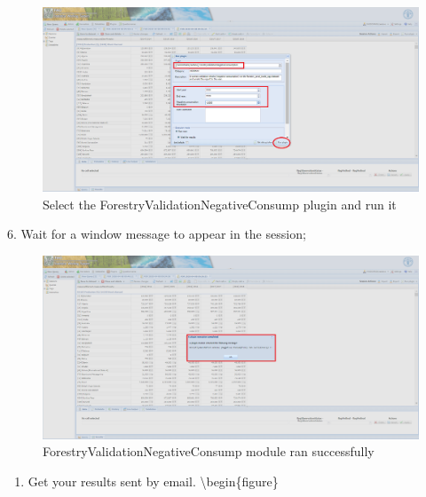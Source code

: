 \documentclass[
]{book}
\providecommand{\tightlist}{%
  \setlength{\itemsep}{0pt}\setlength{\parskip}{0pt}}
\begin{document}
\begin{figure}

{\centering \includegraphics[width=1\linewidth]{images/negative_comsumption_parameters} 

}

\caption{Select the ForestryValidationNegativeConsump plugin and run it}\label{fig:NegConsumpPlugin}
\end{figure}

6. Wait for a window message to appear in the session;

\begin{figure}

{\centering \includegraphics[width=1\linewidth]{images/negative_consump_message} 

}

\caption{ForestryValidationNegativeConsump module ran successfully}\label{fig:negConsumpPluginResults}
\end{figure}

\begin{enumerate}
\def\labelenumi{\arabic{enumi}.}
\setcounter{enumi}{6}
\tightlist
\item
  Get your results sent by email.
  \textbackslash begin\{figure\}
\end{enumerate}
\end{document}

